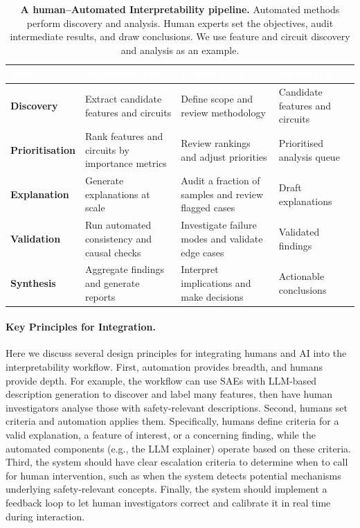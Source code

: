 \begin{table}[tb]
\centering
\caption{\textbf{A human--Automated Interpretability pipeline.} Automated methods perform discovery and analysis. Human experts set the objectives, audit intermediate results, and draw conclusions. We use feature and circuit discovery and analysis as an example.}
\label{tab:human-automated-workflow}
\renewcommand{\arraystretch}{1.3}
\begin{tabular}{>{\raggedright\arraybackslash}p{2.5cm} >{\raggedright\arraybackslash}p{4.5cm} >{\raggedright\arraybackslash}p{4.5cm} >{\raggedright\arraybackslash}p{3cm}}
\toprule
\rowcolor{tableheader!80} \textcolor{white}{\textbf{Stage}} & \textcolor{white}{\textbf{Automated Role}} & \textcolor{white}{\textbf{Human Role}} & \textcolor{white}{\textbf{Deliverable}} \\
\midrule
\rowcolor{tablerow1} \textbf{Discovery} & Extract candidate features and circuits & Define scope and review methodology & Candidate features and circuits \\
\rowcolor{tablerow2} \textbf{Prioritisation} & Rank features and circuits by importance metrics & Review rankings and adjust priorities & Prioritised analysis queue \\
\rowcolor{tablerow1} \textbf{Explanation} & Generate explanations at scale & Audit a fraction of samples and review flagged cases & Draft explanations \\
\rowcolor{tablerow2} \textbf{Validation} & Run automated consistency and causal checks & Investigate failure modes and validate edge cases & Validated findings \\
\rowcolor{tablerow1} \textbf{Synthesis} & Aggregate findings and generate reports & Interpret implications and make decisions & Actionable conclusions \\
\bottomrule
\end{tabular}
\end{table}

\paragraph{Key Principles for Integration.}
Here we discuss several design principles for integrating humans and AI into the interpretability workflow. First, automation provides breadth, and humans provide depth. For example, the workflow can use SAEs with LLM-based description generation to discover and label many features, then have human investigators analyse those with safety-relevant descriptions. Second, humans set criteria and automation applies them. Specifically, humans define criteria for a valid explanation, a feature of interest, or a concerning finding, while the automated components (e.g., the LLM explainer) operate based on these criteria. Third, the system should have clear escalation criteria to determine when to call for human intervention, such as when the system detects potential mechanisms underlying safety-relevant concepts. Finally, the system should implement a feedback loop to let human investigators correct and calibrate it in real time during interaction.

